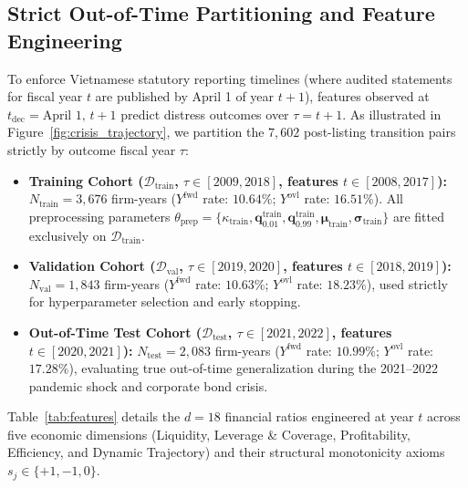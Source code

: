 \documentclass[11pt,a4paper]{article}
\begin{document}
\subsection{Strict Out-of-Time Partitioning and Feature Engineering}
To enforce Vietnamese statutory reporting timelines (where audited statements for fiscal year $t$ are published by April 1 of year $t+1$), features observed at $t_{\text{dec}} = \text{April 1, } t+1$ predict distress outcomes over $\tau = t+1$. As illustrated in Figure~\ref{fig:crisis_trajectory}, we partition the $7,602$ post-listing transition pairs strictly by outcome fiscal year $\tau$:
\begin{itemize}
    \item \textbf{Training Cohort ($\mathcal{D}_{\text{train}}$, $\tau \in [2009, 2018]$, features $t \in [2008, 2017]$):} $N_{\text{train}} = 3,676$ firm-years ($Y^{\text{fwd}}$ rate: $10.64\%$; $Y^{\text{ovl}}$ rate: $16.51\%$). All preprocessing parameters $\theta_{\text{prep}} = \{\kappa_{\text{train}}, \mathbf{q}_{0.01}^{\text{train}}, \mathbf{q}_{0.99}^{\text{train}}, \boldsymbol{\mu}_{\text{train}}, \boldsymbol{\sigma}_{\text{train}}\}$ are fitted exclusively on $\mathcal{D}_{\text{train}}$.
    \item \textbf{Validation Cohort ($\mathcal{D}_{\text{val}}$, $\tau \in [2019, 2020]$, features $t \in [2018, 2019]$):} $N_{\text{val}} = 1,843$ firm-years ($Y^{\text{fwd}}$ rate: $10.63\%$; $Y^{\text{ovl}}$ rate: $18.23\%$), used strictly for hyperparameter selection and early stopping.
    \item \textbf{Out-of-Time Test Cohort ($\mathcal{D}_{\text{test}}$, $\tau \in [2021, 2022]$, features $t \in [2020, 2021]$):} $N_{\text{test}} = 2,083$ firm-years ($Y^{\text{fwd}}$ rate: $10.99\%$; $Y^{\text{ovl}}$ rate: $17.28\%$), evaluating true out-of-time generalization during the 2021--2022 pandemic shock and corporate bond crisis.
\end{itemize}

Table~\ref{tab:features} details the $d=18$ financial ratios engineered at year $t$ across five economic dimensions (Liquidity, Leverage \& Coverage, Profitability, Efficiency, and Dynamic Trajectory) and their structural monotonicity axioms $s_j \in \{+1, -1, 0\}$.
\end{document}
